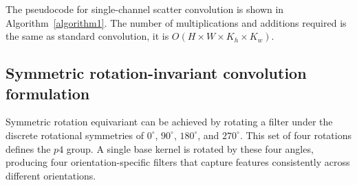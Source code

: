 The pseudocode for single-channel scatter convolution is shown in Algorithm~\ref{algorithm1}.
The number of multiplications and additions required is the same as standard convolution, it is $O(H \times W \times K_h \times K_w)$.
\begin{algorithm}
\SetAlgoLined
{}
\;
\caption{Convolution with scatter operation}
\label{algorithm1}
\end{algorithm}

\subsection{Symmetric rotation-invariant convolution formulation} \label{subsec:accSymRot}

Symmetric rotation equivariant can be achieved by rotating a filter under the discrete rotational symmetries of $0^\circ$, $90^\circ$, $180^\circ$, and $270^\circ$. This set of four rotations defines the $p4$ group. 
A single base kernel is rotated by these four angles, producing four orientation-specific filters that capture features consistently across different orientations.


